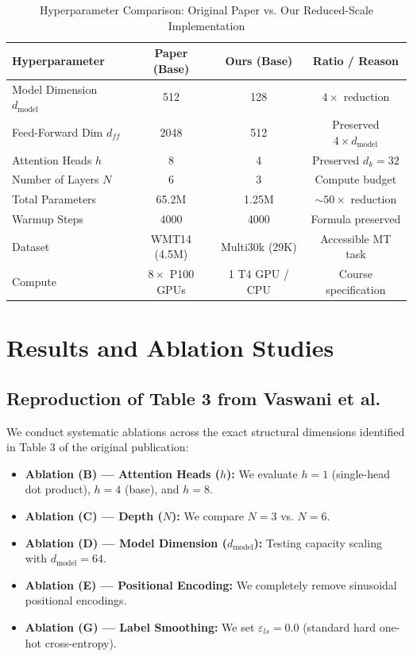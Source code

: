 \documentclass[conference]{IEEEtran}
\begin{document}
\begin{table}[htbp]
\caption{Hyperparameter Comparison: Original Paper vs. Our Reduced-Scale Implementation}
\begin{center}
\begin{tabular}{lccc}
\toprule
\textbf{Hyperparameter} & \textbf{Paper (Base)} & \textbf{Ours (Base)} & \textbf{Ratio / Reason} \\
\midrule
Model Dimension $d_{\text{model}}$ & 512 & 128 & $4\times$ reduction \\
Feed-Forward Dim $d_{ff}$ & 2048 & 512 & Preserved $4 \times d_{\text{model}}$ \\
Attention Heads $h$ & 8 & 4 & Preserved $d_k = 32$ \\
Number of Layers $N$ & 6 & 3 & Compute budget \\
Total Parameters & 65.2M & 1.25M & $\sim 50\times$ reduction \\
Warmup Steps & 4000 & 4000 & Formula preserved \\
Dataset & WMT14 (4.5M) & Multi30k (29K) & Accessible MT task \\
Compute & $8 \times$ P100 GPUs & 1 T4 GPU / CPU & Course specification \\
\bottomrule
\end{tabular}
\label{tab:scale_comparison}
\end{center}
\end{table}

\section{Results and Ablation Studies}

\subsection{Reproduction of Table 3 from Vaswani et al.}
We conduct systematic ablations across the exact structural dimensions identified in Table 3 of the original publication:
\begin{itemize}
    \item \textbf{Ablation (B) --- Attention Heads ($h$):} We evaluate $h=1$ (single-head dot product), $h=4$ (base), and $h=8$.
    \item \textbf{Ablation (C) --- Depth ($N$):} We compare $N=3$ vs. $N=6$.
    \item \textbf{Ablation (D) --- Model Dimension ($d_{\text{model}}$):} Testing capacity scaling with $d_{\text{model}}=64$.
    \item \textbf{Ablation (E) --- Positional Encoding:} We completely remove sinusoidal positional encodings.
    \item \textbf{Ablation (G) --- Label Smoothing:} We set $\varepsilon_{ls} = 0.0$ (standard hard one-hot cross-entropy).
\end{itemize}
\end{document}
